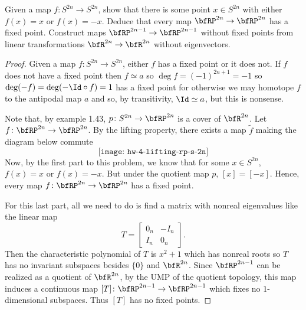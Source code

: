 \begin{problem}[Hatcher {\S}2.2, Ex.\@ 2]
Given a map $f\colon S^{2n}\to S^{2n}$, show that there is some point $x\in
S^{2n}$ with either $f(x)=x$ or $f(x)=-x$. Deduce that every map
$\bfRP^{2n}\to\bfRP^{2n}$ has a fixed point. Construct maps
$\bfRP^{2n-1}\to\bfRP^{2n-1}$ without fixed points from linear
transformations $\bfR^{2n}\to\bfR^{2n}$ without eigenvectors.
\end{problem}
\begin{proof}
Given a map $f\colon S^{2n}\to S^{2n}$, either $f$ has a fixed point or it
does not. If $f$ does not have a fixed point then $f\simeq a$ so $\deg
f=(-1)^{2n+1}=-1$ so $\deg(-f)=\deg(-\Id\circ f)=1$ has a fixed point for
otherwise we may homotope $f$  to the antipodal map $a$ and so, by
transitivity, $\Id\simeq a$, but this is nonsense.

Note that, by example 1.43, $p\colon S^{2n}\to\bfRP^{2n}$ is a cover of
$\bfR^{2n}$. Let $f\colon\bfRP^{2n}\to\bfRP^{2n}$. By the lifting property,
there exists a map $\tilde f$ making the diagram below commute
\begin{equation}
\label{eq:commutative-lifting-property}
\texttt{[image: hw-4-lifting-rp-s-2n]}
\end{equation}
Now, by the first part to this problem, we know that for some $x\in
S^{2n}$, $f(x)=x$ or $f(x)=-x$. But under the quotient map $p$,
$[x]=[-x]$. Hence, every map $f\colon\bfRP^{2n}\to\bfRP^{2n}$ has a fixed
point.

For this last part, all we need to do is find a matrix with nonreal
eigenvalues like the linear map
\begin{equation}
\label{eq:linear-map-with-complex-eigenvalues}
T=
\begin{bmatrix}
0_n&-I_n\\
I_n&0_n
\end{bmatrix}.
\end{equation}
Then the characteristic polynomial of $T$ is $x^2+1$ which has nonreal
roots so $T$ has no invariant subspaces besides $\{0\}$ and
$\bfR^{2n}$. Since $\bfRP^{2n-1}$ can be realized as a quotient of
$\bfR^{2n}$, by the UMP of the quotient topology, this map induces a
continuous map $[T]\colon\bfRP^{2n-1}\to\bfRP^{2n-1}$ which fixes no
$1$-dimensional subspaces. Thus $[T]$ has no fixed points.
\end{proof}

